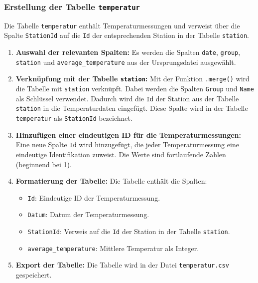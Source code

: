 \documentclass[a4paper,12pt]{article}
\begin{document}
\subsubsection{Erstellung der Tabelle \texttt{temperatur}}
Die Tabelle \texttt{temperatur} enthält Temperaturmessungen und verweist über die Spalte \texttt{StationId} auf die \texttt{Id} der entsprechenden Station in der Tabelle \texttt{station}.

\begin{enumerate}
    \item \textbf{Auswahl der relevanten Spalten:}
    Es werden die Spalten \texttt{date}, \texttt{group}, \texttt{station} und \texttt{average\_temperature} aus der Ursprungsdatei ausgewählt.
    
    \item \textbf{Verknüpfung mit der Tabelle \texttt{station}:}
    Mit der Funktion \texttt{.merge()} wird die Tabelle mit \texttt{station} verknüpft. Dabei werden die Spalten \texttt{Group} und \texttt{Name} als Schlüssel verwendet.
    Dadurch wird die \texttt{Id} der Station aus der Tabelle \texttt{station} in die Temperaturdaten eingefügt. Diese Spalte wird in der Tabelle \texttt{temperatur} als \texttt{StationId} bezeichnet.
    
    \item \textbf{Hinzufügen einer eindeutigen ID für die Temperaturmessungen:}
    Eine neue Spalte \texttt{Id} wird hinzugefügt, die jeder Temperaturmessung eine eindeutige Identifikation zuweist. Die Werte sind fortlaufende Zahlen (beginnend bei 1).
    
    \item \textbf{Formatierung der Tabelle:}
    Die Tabelle enthält die Spalten:
    \begin{itemize}
        \item \texttt{Id}: Eindeutige ID der Temperaturmessung.
        \item \texttt{Datum}: Datum der Temperaturmessung.
        \item \texttt{StationId}: Verweis auf die \texttt{Id} der Station in der Tabelle \texttt{station}.
        \item \texttt{average\_temperature}: Mittlere Temperatur als Integer.
    \end{itemize}
    
    \item \textbf{Export der Tabelle:}
    Die Tabelle wird in der Datei \texttt{temperatur.csv} gespeichert.
\end{enumerate}
\end{document}

